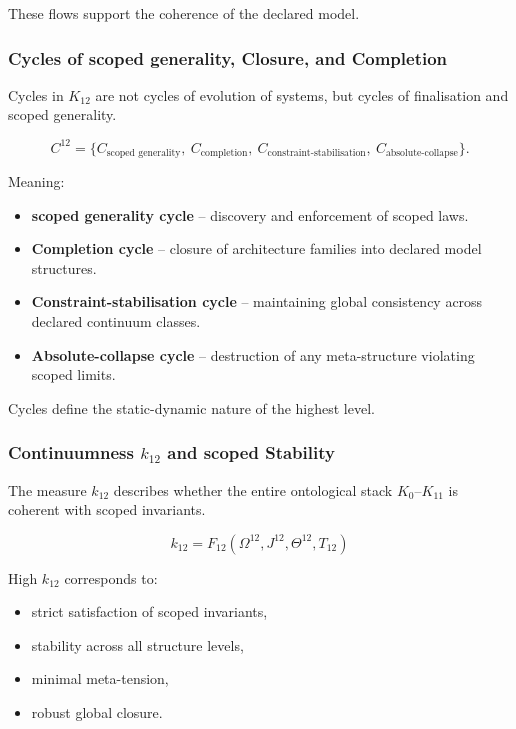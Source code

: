 These flows support the coherence of the declared model.

\subsubsection{Cycles of scoped generality, Closure, and Completion}

Cycles in $K_{12}$ are not cycles of evolution of systems,
but cycles of finalisation and scoped generality.

\[
C^{12} = \{
C_{\text{scoped generality}},\
C_{\text{completion}},\
C_{\text{constraint-stabilisation}},\
C_{\text{absolute-collapse}}
\}.
\]

Meaning:
\begin{itemize}
    \item \textbf{scoped generality cycle}
      -- discovery and enforcement of scoped laws.

    \item \textbf{Completion cycle}
      -- closure of architecture families into declared model structures.

    \item \textbf{Constraint-stabilisation cycle}
      -- maintaining global consistency across declared continuum classes.

    \item \textbf{Absolute-collapse cycle}
      -- destruction of any meta-structure violating scoped limits.
\end{itemize}

Cycles define the static-dynamic nature of the highest level.

\subsubsection{Continuumness $k_{12}$ and scoped Stability}

The measure $k_{12}$ describes whether
the entire ontological stack $K_0$--$K_{11}$
is coherent with scoped invariants.

\[
k_{12} = F_{12}(\Omega^{12}, J^{12}, \Theta^{12}, T_{12})
\]

High $k_{12}$ corresponds to:
\begin{itemize}
    \item strict satisfaction of scoped invariants,
    \item stability across all structure levels,
    \item minimal meta-tension,
    \item robust global closure.
\end{itemize}

